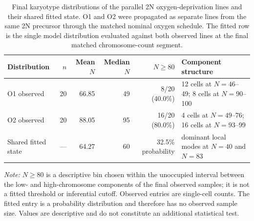 \begin{table}[!htbp]
\centering
\small
\setlength{\tabcolsep}{5pt}
\caption{Final karyotype distributions of the parallel 2N oxygen-deprivation lines and their shared fitted state. O1 and O2 were propagated as separate lines from the same 2N precursor through the matched nominal oxygen schedule. The fitted row is the single model distribution evaluated against both observed lines at the final matched chromosome-count segment.}
\label{tab:invitro_o1_o2_final_karyotype}
\begin{tabular}{@{}lrrrrp{}@{}}
\toprule
Distribution & \(n\) & Mean \(N\) & Median \(N\) & \(N\geq80\) & Component structure \\
\midrule
O1 observed & 20 & 66.85 & 49 & 8/20 (40.0\%) & 12 cells at \(N=46\)--49; 8 cells at \(N=90\)--100 \\
O2 observed & 20 & 88.05 & 95 & 16/20 (80.0\%) & 4 cells at \(N=49\)--76; 16 cells at \(N=93\)--99 \\
Shared fitted state & --- & 64.27 & 60 & 32.5\% probability & dominant local modes at \(N=40\) and \(N=83\) \\
\bottomrule
\end{tabular}
\par\vspace{0.5em}
\begin{minipage}{0.96\textwidth}
\footnotesize
\textit{Note:} \(N\geq80\) is a descriptive bin chosen within the unoccupied interval between the low- and high-chromosome components of the final observed samples; it is not a fitted threshold or inferential cutoff. Observed entries are single-cell counts. The fitted entry is a probability distribution and therefore has no observed sample size. Values are descriptive and do not constitute an additional statistical test.
\end{minipage}
\end{table}
